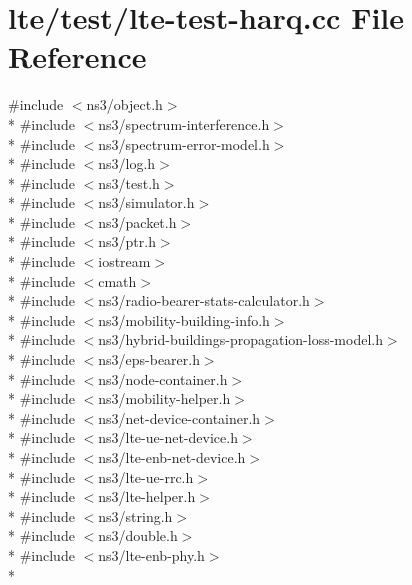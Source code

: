 \hypertarget{lte-test-harq_8cc}{}\section{lte/test/lte-\/test-\/harq.cc File Reference}
\label{lte-test-harq_8cc}
{\ttfamily \#include $<$ns3/object.\+h$>$}\\*
{\ttfamily \#include $<$ns3/spectrum-\/interference.\+h$>$}\\*
{\ttfamily \#include $<$ns3/spectrum-\/error-\/model.\+h$>$}\\*
{\ttfamily \#include $<$ns3/log.\+h$>$}\\*
{\ttfamily \#include $<$ns3/test.\+h$>$}\\*
{\ttfamily \#include $<$ns3/simulator.\+h$>$}\\*
{\ttfamily \#include $<$ns3/packet.\+h$>$}\\*
{\ttfamily \#include $<$ns3/ptr.\+h$>$}\\*
{\ttfamily \#include $<$iostream$>$}\\*
{\ttfamily \#include $<$cmath$>$}\\*
{\ttfamily \#include $<$ns3/radio-\/bearer-\/stats-\/calculator.\+h$>$}\\*
{\ttfamily \#include $<$ns3/mobility-\/building-\/info.\+h$>$}\\*
{\ttfamily \#include $<$ns3/hybrid-\/buildings-\/propagation-\/loss-\/model.\+h$>$}\\*
{\ttfamily \#include $<$ns3/eps-\/bearer.\+h$>$}\\*
{\ttfamily \#include $<$ns3/node-\/container.\+h$>$}\\*
{\ttfamily \#include $<$ns3/mobility-\/helper.\+h$>$}\\*
{\ttfamily \#include $<$ns3/net-\/device-\/container.\+h$>$}\\*
{\ttfamily \#include $<$ns3/lte-\/ue-\/net-\/device.\+h$>$}\\*
{\ttfamily \#include $<$ns3/lte-\/enb-\/net-\/device.\+h$>$}\\*
{\ttfamily \#include $<$ns3/lte-\/ue-\/rrc.\+h$>$}\\*
{\ttfamily \#include $<$ns3/lte-\/helper.\+h$>$}\\*
{\ttfamily \#include $<$ns3/string.\+h$>$}\\*
{\ttfamily \#include $<$ns3/double.\+h$>$}\\*
{\ttfamily \#include $<$ns3/lte-\/enb-\/phy.\+h$>$}\\*

